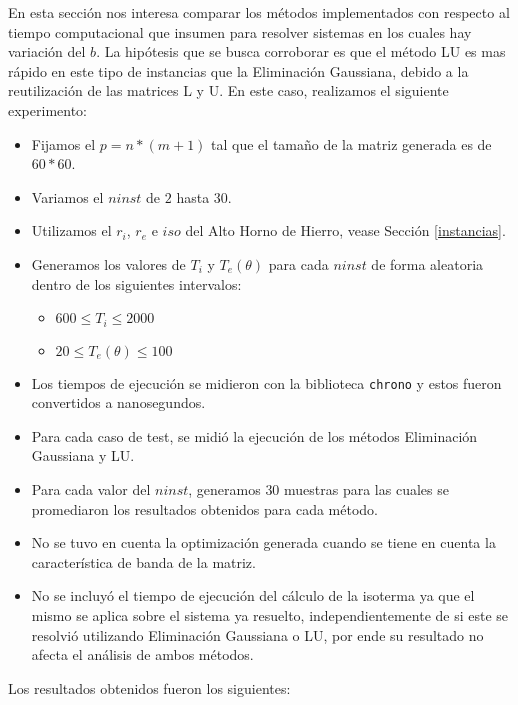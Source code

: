 En esta sección nos interesa comparar los métodos implementados con respecto al tiempo computacional que insumen para resolver sistemas en los cuales hay variación del $b$.
La hipótesis que se busca corroborar es que el método LU es mas rápido en este tipo de instancias que la Eliminación Gaussiana, debido a la reutilización de las matrices L y U.
\newline
\newline
En este caso, realizamos el siguiente experimento:
\begin{itemize}
    \item Fijamos el $p = n*(m+1)$ tal que el tamaño de la matriz generada es de $60*60$.
    \item Variamos el $ninst$ de $2$ hasta $30$.
    \item Utilizamos el $r_i$, $r_e$ e $iso$ del Alto Horno de Hierro, vease Sección \ref{instancias}.
    \item Generamos los valores de $T_{i}$ y $T_{e}(\theta)$ para cada $ninst$ de forma aleatoria dentro de los siguientes intervalos:
    \begin{itemize}
      \item $600 \leq T_{i} \leq 2000$
      \item $20 \leq T_{e}(\theta) \leq 100$
    \end{itemize}
    \item Los tiempos de ejecución se midieron con la biblioteca \texttt{chrono} y estos fueron convertidos a nanosegundos.
    \item Para cada caso de test, se midió la ejecución de los métodos Eliminación Gaussiana y LU.
    \item Para cada valor del $ninst$, generamos $30$ muestras para las cuales se promediaron los resultados obtenidos para cada método.
    \item No se tuvo en cuenta la optimización generada cuando se tiene en cuenta la característica de banda de la matriz.
	\item No se incluyó el tiempo de ejecución del cálculo de la isoterma ya que
		el mismo se aplica sobre el sistema ya resuelto,
		independientemente de si este se resolvió utilizando Eliminación
		Gaussiana o LU, por ende su resultado no afecta el análisis de ambos
		métodos.
\end{itemize}

Los resultados obtenidos fueron los siguientes:

